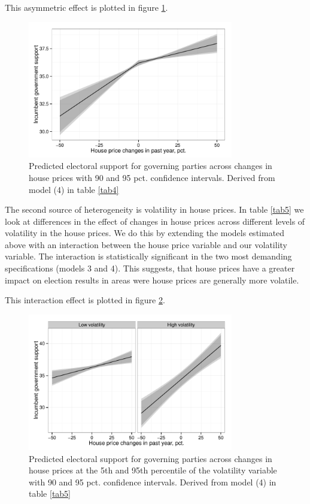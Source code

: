 \documentclass[12pt,a4paper]{article}
\begin{document}


This asymmetric effect is plotted in figure \ref{posneg}.

\begin{figure}[htbp]
	\includegraphics[page=1,width=0.8\textwidth]{../figures/posnegplot}
	\centering
	\caption{Predicted electoral support for governing parties across changes in house prices with 90 and 95 pct. confidence intervals. Derived from model (4) in table \ref{tab4}}
	\label{posneg}
\end{figure}

The second source of heterogeneity is volatility in house prices. In table \ref{tab5} we look at differences in the effect of changes in house prices across different levels of volatility in the house prices.  We do this by extending the models estimated above with an interaction between the house price variable and our volatility variable. The interaction is statistically significant in the two most demanding specifications (models 3 and 4). This suggests, that house prices have a greater impact on election results in areas were house prices are generally more volatile. 



This interaction effect is plotted in figure \ref{vola}.

\begin{figure}[htbp]
	\includegraphics[page=1,width=0.8\textwidth]{../figures/volaplot}
	\centering
	\caption{Predicted electoral support for governing parties across changes in house prices at the 5th and 95th percentile of the volatility variable with 90 and 95 pct. confidence intervals. Derived from model (4) in table \ref{tab5}}
	\label{vola}
\end{figure}
\end{document}

